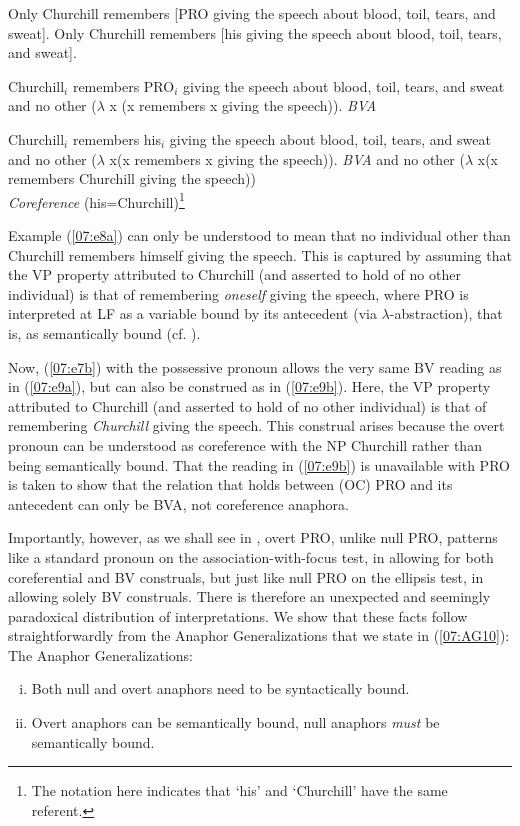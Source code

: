 \documentclass[output=paper,colorlinks,citecolor=brown,draft,draftmode]{langscibook}
\begin{document}
\ea \label{07:e7}
\ea \label{07:e7a} Only Churchill remembers [PRO giving the speech about blood, toil, tears, and sweat].
\ex \label{07:e7b} Only Churchill remembers [his giving the speech about blood, toil, tears, and sweat].
\z

\ex \label{07:e8}
 Churchill$_i$ remembers PRO$_i$ giving the speech about blood, toil, tears, and sweat
 \ea \label{07:e8a} and no other ($\lambda$ x (x remembers x giving the speech)). \hfill \textit{BVA}

 \z
\z
\ea \label{07:e9}
Churchill$_i$ remembers his$_i$ giving the speech about blood, toil, tears, and sweat
 \ea \label{07:e9a} and no other ($\lambda$ x(x remembers x giving the speech)). \hfill \textit{BVA}
 \ex \label{07:e9b} and no other ($\lambda$ x(x remembers Churchill giving the speech))
 \\
 \hfill \textit{Coreference} (his=Churchill)\footnote{The notation here indicates that ‘his’ and ‘Churchill’ have the same referent.}
 \z
\z

Example (\ref{07:e8a}) can only be understood to mean that no individual other than Churchill remembers himself giving the speech. This is captured by assuming that the VP property attributed to Churchill (and asserted to hold of no other individual) is that of remembering \textit{oneself} giving the speech, where PRO is interpreted at LF as a variable bound by its antecedent (via $\lambda$-abstraction), that is, as semantically bound (cf. \citealt{HeimandKratzer98, buring05}).

Now, (\ref{07:e7b}) with the possessive pronoun allows the very same BV reading as in (\ref{07:e9a}), but can also be construed as in (\ref{07:e9b}). Here, the VP property attributed to Churchill (and asserted to hold of no other individual) is that of remembering \textit{Churchill} giving the speech. This construal arises because the overt pronoun can be understood as coreference with the NP Churchill rather than being semantically bound. That the reading in (\ref{07:e9b}) is unavailable with PRO is taken to show that the relation that holds between (OC) PRO and its antecedent can only be BVA, not coreference anaphora.

Importantly, however, as we shall see in , overt PRO, unlike null PRO, patterns like a standard pronoun on the association-with-focus test, in allowing for both coreferential and BV construals, but just like null PRO on the ellipsis test, in allowing solely BV construals. There is therefore an unexpected and seemingly paradoxical distribution of interpretations. We show that these facts follow straightforwardly from the Anaphor Generalizations that we state in (\ref{07:AG10}):
\ea\label{07:AG10}
{The Anaphor Generalizations:}
\begin{enumerate}[(i)]
    \item Both null and overt anaphors need to be syntactically bound.
    \item Overt anaphors can be semantically bound, null anaphors \textit{must} be semantically bound.
\end{enumerate}
\z
\end{document}
